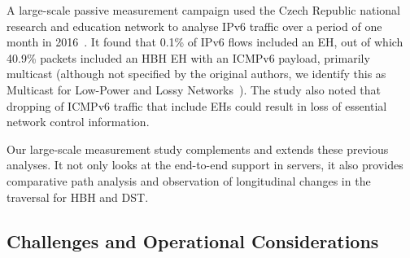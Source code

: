 \documentclass[conference]{IEEEtran}
\begin{document}

A large-scale passive measurement campaign used the Czech Republic national
research and education network to analyse IPv6 traffic over a period of one month in
2016~\cite{passive-threats}. It found that 0.1\% of IPv6 flows included an EH, out of which 40.9\% packets included an HBH EH with an ICMPv6
payload, primarily multicast (although not specified by the original authors,
we identify this as Multicast for Low-Power and Lossy Networks~\cite{RFC7731}).
The study also noted that dropping of ICMPv6 traffic that include EHs could result in
loss of essential network control information. 


Our large-scale measurement study complements and extends these previous analyses. It not only
looks at the end-to-end support in servers, it also provides comparative path
analysis and observation of longitudinal changes in the traversal for HBH and DST.

\subsection{Challenges and Operational Considerations}
\end{document}
